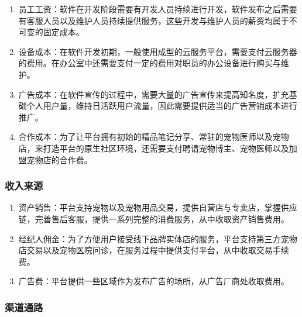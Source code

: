 \documentclass[a4paper]{ctexart}
\begin{document}
\begin{enumerate}[label=\alph*.]
  \item 员工工资：软件在开发阶段需要有开发人员持续进行开发，软件发布之后需要有客服人员以及维护人员持续提供服务，这些开发与维护人员的薪资均属于不可变的固定成本。
  \item 设备成本：在软件开发初期，一般使用成型的云服务平台，需要支付云服务器的费用。在办公室中还需要支付一定的费用对职员的办公设备进行购买与维护。
  \item 广告成本：在软件宣传的过程中，需要大量的广告宣传来提高知名度，扩充基础个人用户量，维持日活跃用户流量，因此需要提供适当的广告营销成本进行推广。 
  \item 合作成本：为了让平台拥有初始的精品笔记分享、常驻的宠物医师以及宠物店，来打造平台的原生社区环境，还需要支付聘请宠物博主、宠物医师以及加盟宠物店的合作费。
\end{enumerate}

\subsubsection{收入来源}

\begin{enumerate}[label=\alph*.]
  \item 资产销售：平台支持宠物以及宠物用品交易，提供自营店与专卖店，掌握供应链，完善售后客服，提供一系列完整的消费服务，从中收取资产销售费用。
  \item 经纪人佣金：为了方便用户接受线下品牌实体店的服务，平台支持第三方宠物店交易以及宠物医院问诊，在服务过程中提供支付平台，从中收取交易手续费。
  \item 广告费：平台提供一些区域作为发布广告的场所，从广告厂商处收取费用。
\end{enumerate}

\subsubsection{渠道通路}
\end{document}

